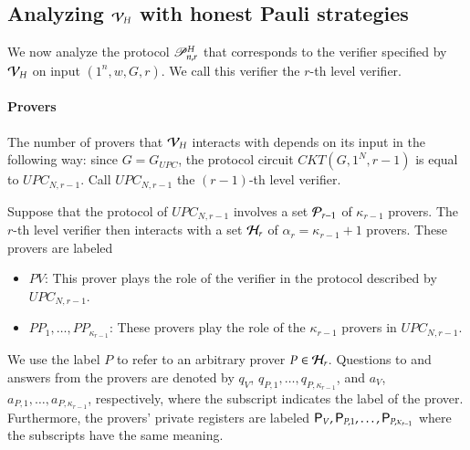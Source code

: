 \subsection{Analyzing $\mathcal V_H$ with honest Pauli strategies}

We now analyze the protocol $\mathscr{P}_{n,r}^H$ that corresponds to the verifier specified by $\mathcal V_H$ on input $(1^n,w,G,r)$. We call this verifier the $r$-th level verifier. 

\paragraph{Provers}

The number of provers that $\mathcal V_H$ interacts with depends on its input in the following way: since $G = G_{UPC}$, the protocol circuit $CKT(G,1^N,r-1)$ is equal to $UPC_{N,r-1}$. Call $UPC_{N,r-1}$ the $(r-1)$-th level verifier.

Suppose that the protocol of $UPC_{N,r-1}$ involves a set $\mathcal P_{r-1}$ of $\kappa_{r-1}$ provers. The $r$-th level verifier then interacts with a set $\mathcal H_r$ of $\alpha_r = \kappa_{r-1} + 1$ provers. These provers are labeled
\begin{itemize}
	\item $PV$: This prover plays the role of the verifier in the protocol described by $UPC_{N,r-1}$. 
	\item $PP_1,\ldots,PP_{\kappa_{r-1}}$: These provers play the role of the $\kappa_{r-1}$ provers in $UPC_{N,r-1}$.
\end{itemize}
We use the label $P$ to refer to an arbitrary prover $P\in\mathcal H_r$. Questions to and answers from the provers are denoted  by $q_V$, $q_{P,1},\ldots,q_{P,\kappa_{r-1}}$, and $a_V$, $a_{P,1},\ldots,a_{P,\kappa_{r-1}}$, respectively, where the subscript indicates the label of the prover. Furthermore, the provers' private registers are labeled ${\mathsf{P}}_V, {\mathsf{P}}_{P,1},\ldots,{\mathsf{P}}_{P,\kappa_{r-1}}$ where the subscripts have the same meaning.



